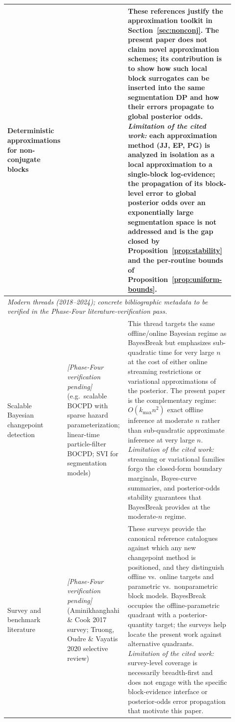 \begin{longtable}{p{0.17\linewidth}p{0.27\linewidth}p{0.48\linewidth}}
Deterministic approximations for non-conjugate blocks &
\citet{jaakkola2000logisticvb, minka2001ep, polson2013pg} &
These references justify the approximation toolkit in Section~\ref{sec:nonconj}. The present paper
does not claim novel approximation schemes; its contribution is to show how such local block
surrogates can be inserted into the same segmentation DP and how their errors propagate to global
posterior odds. \emph{Limitation of the cited work:} each approximation method (JJ, EP, PG) is
analyzed in isolation as a local approximation to a single-block log-evidence; the propagation of
its block-level error to global posterior odds over an exponentially large segmentation space is
not addressed and is the gap closed by Proposition~\ref{prop:stability} and the per-routine
bounds of Proposition~\ref{prop:uniform-bounds}. \\

\midrule
\multicolumn{3}{l}{\emph{Modern threads
(2018--2024); concrete bibliographic metadata to be verified in the Phase-Four
literature-verification pass.}} \\
\midrule

Scalable Bayesian changepoint detection &
\emph{[Phase-Four verification pending]} (e.g.\ scalable BOCPD with sparse hazard parameterization;
linear-time particle-filter BOCPD; SVI for segmentation models) &
This thread targets the same offline/online Bayesian regime as BayesBreak but emphasizes
sub-quadratic time for very large $n$ at the cost of either online streaming
restrictions or variational approximations of the posterior. The present paper is the
complementary regime: $O(k_{\max}n^2)$ exact offline inference at moderate $n$ rather than
sub-quadratic approximate inference at very large $n$. \emph{Limitation of the cited
work:} streaming or variational families forgo the closed-form boundary marginals,
Bayes-curve summaries, and posterior-odds stability guarantees that BayesBreak provides at the
moderate-$n$ regime. \\

Survey and benchmark literature &
\emph{[Phase-Four verification pending]} (Aminikhanghahi \& Cook 2017 survey; Truong, Oudre \& Vayatis 2020 selective review)
&
These surveys provide the canonical reference catalogues against which any new changepoint
method is positioned, and they distinguish offline vs.\ online targets and parametric vs.\
nonparametric block models. BayesBreak occupies the offline-parametric quadrant with a
posterior-quantity target; the surveys help locate the present work against alternative
quadrants. \emph{Limitation of the cited work:} survey-level coverage is necessarily
breadth-first and does not engage with the specific block-evidence interface or
posterior-odds error propagation that motivate this paper. \\


\end{longtable}
